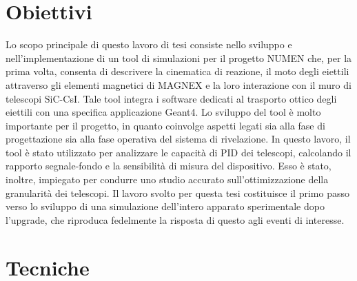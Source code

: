 \documentclass[10pt,foldmark,notumble]{leaflet}
\newcommand{\geant}{Geant4}
\begin{document}
\section{Obiettivi}
Lo scopo principale di questo lavoro di tesi consiste nello sviluppo e nell'implementazione di un tool di simulazioni per il progetto NUMEN che, per la prima volta, consenta di descrivere la cinematica di reazione, il moto degli eiettili attraverso gli elementi magnetici di MAGNEX e la loro interazione con il muro di telescopi SiC-CsI.
Tale tool integra i software dedicati al trasporto ottico degli eiettili con una specifica applicazione \geant.
Lo sviluppo del tool è molto importante per il progetto, in quanto coinvolge aspetti legati sia alla fase di progettazione sia alla fase operativa del sistema di rivelazione.
In questo lavoro, il tool è stato utilizzato per analizzare le capacità di PID dei telescopi, calcolando il rapporto segnale-fondo e la sensibilità di misura del dispositivo.
Esso è stato, inoltre, impiegato per condurre uno studio accurato sull'ottimizzazione della granularità dei telescopi.
Il lavoro svolto per questa tesi costituisce il primo passo verso lo sviluppo di una simulazione dell'intero apparato sperimentale dopo l'upgrade, che riproduca fedelmente la risposta di questo agli eventi di interesse.






\section{Tecniche}
\end{document}
